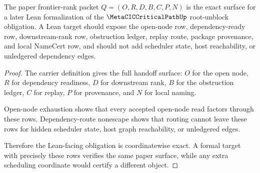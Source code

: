 \begin{theorem}
\label{thm:metacic-critical-path-lean-handoff-surface}
The paper frontier-rank packet $Q=(O,R,D,B,C,P,N)$ is the exact surface for a later Lean formalization of the $\MetaCICCriticalPathUp$ root-unblock obligation. A Lean target should expose the open-node row, dependency-ready row, downstream-rank row, obstruction ledger, replay route, package provenance, and local NameCert row, and should not add scheduler state, host reachability, or unledgered dependency edges.
\end{theorem}
\begin{proof}
The carrier definition gives the full handoff surface: $O$ for the open node, $R$ for dependency readiness, $D$ for downstream rank, $B$ for the obstruction ledger, $C$ for replay, $P$ for provenance, and $N$ for local naming.

Open-node exhaustion shows that every accepted open-node read factors through these rows. Dependency-route nonescape shows that routing cannot leave these rows for hidden scheduler state, host graph reachability, or unledgered edges.

Therefore the Lean-facing obligation is coordinatewise exact. A formal target with precisely these rows verifies the same paper surface, while any extra scheduling coordinate would certify a different object.
\end{proof}

